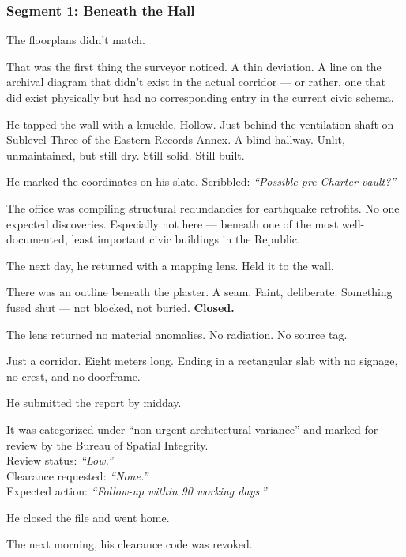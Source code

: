 \documentclass[9pt]{article}
\begin{document}
\newpage

\subsubsection*{Segment 1: Beneath the Hall}

The floorplans didn’t match.

That was the first thing the surveyor noticed. A thin deviation. A line on the archival diagram that didn’t exist in the actual corridor --- or rather, one that did exist physically but had no corresponding entry in the current civic schema.

He tapped the wall with a knuckle. Hollow. Just behind the ventilation shaft on Sublevel Three of the Eastern Records Annex. A blind hallway. Unlit, unmaintained, but still dry. Still solid. Still built.

He marked the coordinates on his slate. Scribbled: \textit{“Possible pre-Charter vault?”}

The office was compiling structural redundancies for earthquake retrofits. No one expected discoveries. Especially not here --- beneath one of the most well-documented, least important civic buildings in the Republic.

The next day, he returned with a mapping lens. Held it to the wall.

There was an outline beneath the plaster. A seam. Faint, deliberate. Something fused shut --- not blocked, not buried. \textbf{Closed.}

The lens returned no material anomalies. No radiation. No source tag.

Just a corridor. Eight meters long. Ending in a rectangular slab with no signage, no crest, and no doorframe.

\vspace{1em}

He submitted the report by midday.

It was categorized under ``non-urgent architectural variance'' and marked for review by the Bureau of Spatial Integrity.\\
Review status: \textit{“Low.”} \\
Clearance requested: \textit{“None.”} \\
Expected action: \textit{“Follow-up within 90 working days.”}

He closed the file and went home.

\vspace{1em}

The next morning, his clearance code was revoked.
\end{document}
